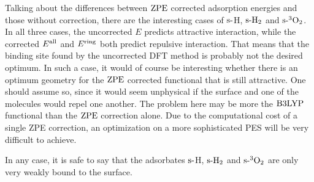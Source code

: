 \documentclass[8.5pt,twoside,twocolumn]{article}
\newcommand\zpe{\enmat{\te{ZPE}}}
\newcommand\ering{\enmat{E^{\te{ring}}}}
\newcommand\eall{\enmat{E^{\te{all}}}}
\newcommand\sur{\enmat{\te{s-}}}
\newcommand\tripot{\enmat{{^3\ot}}}
\theoremstyle{standard}
\begin{document}
Talking about the differences between $\zpe$ corrected adsorption energies
and those without correction, there are the interesting cases of 
$\sur$H, $\sur\htw$ and $\sur\tripot$. In all three cases, the uncorrected
$E$ predicts attractive interaction, while the corrected $\eall$
and $\ering$ both predict repulsive interaction. That means that
the binding site found by the uncorrected DFT method is probably not the
desired optimum.
In such a case, it would of
course be interesting whether there is an optimum geometry for the $\zpe$
corrected functional that is still attractive. One should assume so,
since it would seem unphysical if the surface and one of the
molecules would repel one another. The problem here may be more the
$\text{B3LYP}$ functional than the $\zpe$ correction alone. Due to the computational
cost of a single ZPE correction, an optimization on a more sophisticated 
PES will be very difficult to achieve.

In any case, it is safe to say that the adsorbates $\sur$H, $\sur\htw$ and $\sur\tripot$
are only very weakly bound to the surface.

\end{document}
